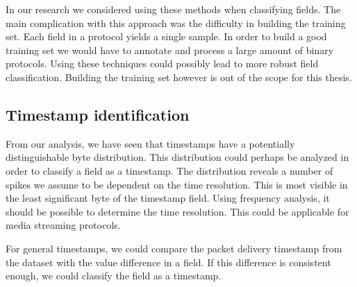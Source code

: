 \documentclass[a4paper]{report}
\begin{document}
In our research we considered using these methods when classifying fields.
The main complication with this approach was the difficulty in building the
training set. Each field in a protocol yields a single sample. In order to
build a good training set we would have to annotate and process a large
amount of binary protocols. Using these techniques could possibly lead to
more robust field classification. Building the training set however is out
of the scope for this thesis.

\subsection{Timestamp identification}
From our analysis, we have seen that timestamps have a potentially
distinguishable byte distribution. This distribution could perhaps be analyzed
in order to classify a field as a timestamp. The distribution reveals a number
of spikes we assume to be dependent on the time resolution. This is most
visible in the least significant byte of the timestamp field. Using frequency
analysis, it should be possible to determine the time resolution. This could
be applicable for media streaming protocols.

For general timestamps, we could compare the packet delivery timestamp from
the dataset with the value difference in a field. If this difference is
consistent enough, we could classify the field as a timestamp.



\end{document}
